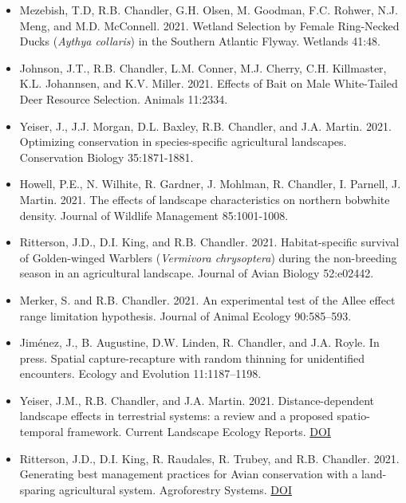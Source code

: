 \documentclass[12pt]{article}
\begin{document}
\begin{itemize}
\item Mezebish, T.D, R.B. Chandler, G.H. Olsen, M. Goodman,
  F.C. Rohwer, N.J. Meng, and M.D. McConnell. 2021. Wetland Selection
  by Female Ring-Necked Ducks ({\it Aythya collaris}) in the Southern
  Atlantic Flyway. Wetlands 41:48.

\item Johnson, J.T., R.B. Chandler, L.M. Conner, M.J. Cherry,
  C.H. Killmaster, K.L. Johannsen, and K.V. Miller. 2021. Effects of
  Bait on Male White-Tailed Deer Resource Selection. Animals 11:2334. 
  
\item Yeiser, J., J.J. Morgan, D.L. Baxley, R.B. Chandler, and
  J.A. Martin. 2021. Optimizing conservation in species-specific
  agricultural landscapes. Conservation Biology 35:1871-1881. 

\item Howell, P.E., N. Wilhite, R. Gardner, J. Mohlman, R. Chandler,
  I. Parnell, J. Martin. 2021. The effects of landscape
  characteristics on northern bobwhite density. Journal of Wildlife
  Management 85:1001-1008. 

\item Ritterson, J.D., D.I. King, and
  R.B. Chandler. 2021. Habitat-specific survival of Golden-winged
  Warblers ({\it Vermivora chrysoptera}) during the non-breeding
  season in an agricultural landscape. Journal of Avian Biology
  52:e02442.  
  
\item Merker, S. and R.B. Chandler. 2021. An experimental test of 
  the Allee effect range limitation hypothesis. Journal of Animal
  Ecology 90:585--593. 

\item Jim\'enez, J., B. Augustine, D.W. Linden, R. Chandler, and
  J.A. Royle. In press. Spatial capture-recapture with random thinning
  for unidentified encounters. Ecology and Evolution 11:1187--1198.

\item Yeiser, J.M., R.B. Chandler, and
  J.A. Martin. 2021. Distance-dependent landscape effects in
  terrestrial systems: a review and a proposed spatio-temporal
  framework. Current Landscape Ecology
  Reports. \href{https://doi.org/10.1007/s40823-020-00061-w}{DOI}

\item Ritterson, J.D., D.I. King, R. Raudales, R. Trubey, and
  R.B. Chandler. 2021. Generating best management practices for Avian
  conservation with a land-sparing agricultural system. Agroforestry
  Systems. \href{https://doi.org/10.1007/s10457-020-00582-7}{DOI}
  

\end{itemize}
\end{document}
